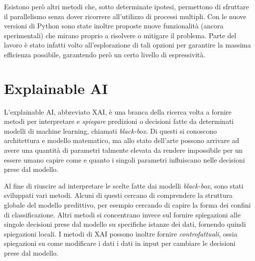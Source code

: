 Esistono però altri metodi che, sotto determinate ipotesi, permettono di
sfruttare il parallelismo senza dover ricorrere all'utilizzo di processi
multipli. Con le nuove versioni di Python sono state inoltre proposte nuove
funzionalità (ancora sperimentali) che mirano proprio a risolvere o mitigare il
problema. Parte del lavoro è stato infatti volto all'esplorazione di tali
opzioni per garantire la massima efficienza possibile, garantendo però un certo
livello di espressività.

\section{Explainable AI}

L'explainable AI, abbreviato XAI, è una branca della ricerca volta a fornire
metodi per interpretare e \textit{spiegare} predizioni o decisioni fatte da
determinati modelli di machine learning, chiamati \textit{black-box}. Di questi
si conoscono architettura e modello matematico, ma allo stato dell'arte possono
arrivare ad avere una quantità di parametri talmente elevata da rendere
impossibile per un essere umano capire come e quanto i singoli parametri
influiscano nelle decisioni prese dal modello.

Al fine di riuscire ad interpretare le scelte fatte dai modelli
\textit{black-box}, sono stati sviluppati vari metodi. Alcuni di questi cercano
di comprendere la struttura globale del modello predittivo, per esempio cercando
di capire la forma dei confini di classificazione. Altri metodi si concentrano
invece sul fornire spiegazioni alle singole decisioni prese dal modello su
specifiche istanze dei dati, fornendo quindi spiegazioni locali. I metodi di
XAI possono inoltre fornire \textit{controfattuali}, ossia spiegazioni su come
modificare i dati i dati in input per cambiare le decisioni prese dal modello.

